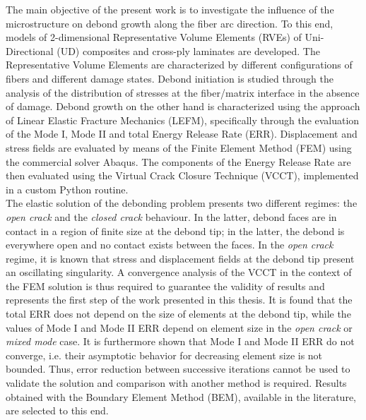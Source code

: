 The main objective of the present work is to investigate the influence of the microstructure on debond growth along the fiber arc direction. To this end, models of 2-dimensional Representative Volume Elements (RVEs) of Uni-Directional (UD) composites and cross-ply laminates are developed. The Representative Volume Elements are characterized by different configurations of fibers and different damage states. Debond initiation is studied through the analysis of the distribution of stresses at the fiber/matrix interface in the absence of damage. Debond growth on the other hand is characterized using the approach of Linear Elastic Fracture Mechanics (LEFM), specifically through the evaluation of the Mode I, Mode II and total Energy Release Rate (ERR). Displacement and stress fields are evaluated by means of the Finite Element Method (FEM) using the commercial solver Abaqus. The components of the Energy Release Rate are then evaluated using the Virtual Crack Closure Technique (VCCT), implemented in a custom Python routine.\\
The elastic solution of the debonding problem presents two different regimes: the \emph{open crack} and the \emph{closed crack} behaviour. In the latter, debond faces are in contact in a region of finite size at the debond tip; in the latter, the debond is everywhere open and no contact exists between the faces. In the \emph{open crack} regime, it is known that stress and displacement fields at the debond tip present an oscillating singularity. A convergence analysis of the VCCT in the context of the FEM solution is thus required to guarantee the validity of results and represents the first step of the work presented in this thesis. It is found that the total ERR does not depend on the size of elements at the debond tip, while the values of Mode I and Mode II ERR depend on element size in the \emph{open crack} or \emph{mixed mode} case. It is furthermore shown that Mode I and Mode II ERR do not converge, i.e. their asymptotic behavior for decreasing element size is not bounded. Thus, error reduction between successive iterations cannot be used to validate the solution and comparison with another method is required. Results obtained with the Boundary Element Method (BEM), available in the literature, are selected to this end.\\
